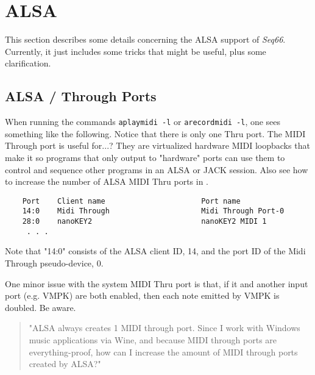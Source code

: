 %
%
%

\section{ALSA}
\label{sec:alsa}

   This section describes some details concerning the ALSA support of
   \textsl{Seq66}.
   Currently, it just includes some tricks that might be useful, plus some
   clarification.

\subsection{ALSA / Through Ports}
\label{subsec:alsa_through_ports}

   When running the commands \texttt{aplaymidi -l} or \texttt{arecordmidi -l},
   one sees something like the following.
   Notice that there is only one Thru port.
   The MIDI Through port is useful for...?
   They are virtualized hardware MIDI loopbacks that make it so
   programs that only output to "hardware" ports can use them
   to control and sequence other programs in an ALSA or JACK session.
   Also see how to increase the number of ALSA MIDI Thru ports in
   \cite{alsathru}.

   \begin{verbatim}
    Port    Client name                      Port name
    14:0    Midi Through                     Midi Through Port-0
    28:0    nanoKEY2                         nanoKEY2 MIDI 1
     . . .
   \end{verbatim}

   Note that "14:0" consists of the ALSA client ID, 14, and the port ID of the
   Midi Through pseudo-device, 0.

   One minor issue with the system MIDI Thru port is that, if it and another
   input port (e.g. VMPK) are both enabled, then each note emitted by VMPK is
   doubled. Be aware.

   \begin{quote}
      "ALSA always creates 1 MIDI through port. Since I work with Windows music
      applications via Wine, and because MIDI through ports are
      everything-proof, how can I increase the amount of MIDI through ports
      created by ALSA?"
   \end{quote}

